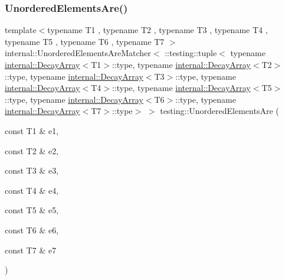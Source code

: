 \subsubsection{\texorpdfstring{UnorderedElementsAre()}{UnorderedElementsAre()}\hspace{0.1cm}{\footnotesize\ttfamily [8/11]}}
{\footnotesize\ttfamily template$<$typename T1 , typename T2 , typename T3 , typename T4 , typename T5 , typename T6 , typename T7 $>$ \\
internal\+::\+Unordered\+Elements\+Are\+Matcher$<$ \+::testing\+::tuple$<$ typename \mbox{\hyperlink{structtesting_1_1internal_1_1DecayArray}{internal\+::\+Decay\+Array}}$<$T1$>$\+::type, typename \mbox{\hyperlink{structtesting_1_1internal_1_1DecayArray}{internal\+::\+Decay\+Array}}$<$T2$>$\+::type, typename \mbox{\hyperlink{structtesting_1_1internal_1_1DecayArray}{internal\+::\+Decay\+Array}}$<$T3$>$\+::type, typename \mbox{\hyperlink{structtesting_1_1internal_1_1DecayArray}{internal\+::\+Decay\+Array}}$<$T4$>$\+::type, typename \mbox{\hyperlink{structtesting_1_1internal_1_1DecayArray}{internal\+::\+Decay\+Array}}$<$T5$>$\+::type, typename \mbox{\hyperlink{structtesting_1_1internal_1_1DecayArray}{internal\+::\+Decay\+Array}}$<$T6$>$\+::type, typename \mbox{\hyperlink{structtesting_1_1internal_1_1DecayArray}{internal\+::\+Decay\+Array}}$<$T7$>$\+::type$>$ $>$ testing\+::\+Unordered\+Elements\+Are (\begin{DoxyParamCaption}\item[{const T1 \&}]{e1,  }\item[{const T2 \&}]{e2,  }\item[{const T3 \&}]{e3,  }\item[{const T4 \&}]{e4,  }\item[{const T5 \&}]{e5,  }\item[{const T6 \&}]{e6,  }\item[{const T7 \&}]{e7 }\end{DoxyParamCaption})\hspace{0.3cm}{\ttfamily [inline]}}

\mbox{\label{namespacetesting_a0f30358234947d21c7f39f15a8395d04}} 
